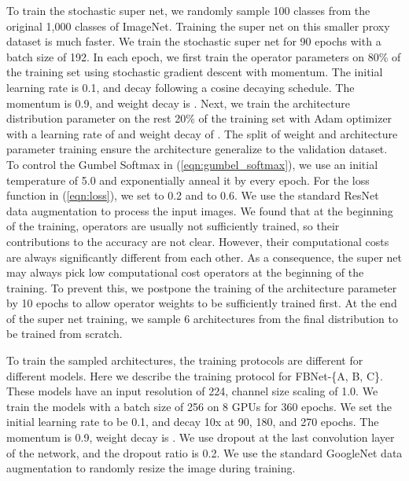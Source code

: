 \documentclass[10pt,twocolumn,letterpaper]{article}
\begin{document}
To train the stochastic super net, we randomly sample 100 classes from the original 1,000 classes of ImageNet. Training the super net on this smaller proxy dataset is much faster. We train the stochastic super net for 90 epochs with a batch size of 192. In each epoch, we first train the operator parameters  on 80\% of the training set using stochastic gradient descent with momentum. The initial learning rate is 0.1, and decay following a cosine decaying schedule. The momentum is 0.9, and weight decay is . Next, we train the architecture distribution parameter  on the rest 20\% of the training set with Adam optimizer \cite{kingma2014adam} with a learning rate of  and weight decay of . The split of weight and architecture parameter training ensure the architecture generalize to the validation dataset. To control the Gumbel Softmax in (\ref{eqn:gumbel_softmax}), we use an initial temperature of 5.0 and exponentially anneal it by  every epoch. For the loss function in (\ref{eqn:loss}), we set  to 0.2 and  to 0.6. We use the standard ResNet data augmentation \cite{he2016deep} to process the input images. We found that at the beginning of the training, operators are usually not sufficiently trained, so their contributions to the accuracy are not clear. However, their computational costs are always significantly different from each other. As a consequence, the super net may always pick low computational cost operators at the beginning of the training. To prevent this, we postpone the training of the architecture parameter  by 10 epochs to allow operator weights to be sufficiently trained first. At the end of the super net training, we sample 6 architectures from the final distribution to be trained from scratch.

To train the sampled architectures, the training protocols are different for different models. Here we describe the training protocol for FBNet-\{A, B, C\}. These models have an input resolution of 224, channel size scaling of 1.0. We train the models with a batch size of 256 on 8 GPUs for 360 epochs. We set the initial learning rate to be 0.1, and decay 10x at 90, 180, and 270 epochs. The momentum is 0.9, weight decay is . We use dropout at the last convolution layer of the network, and the dropout ratio is 0.2. We use the standard GoogleNet data augmentation \cite{szegedy2015going} to randomly resize the image during training. 
\end{document}
